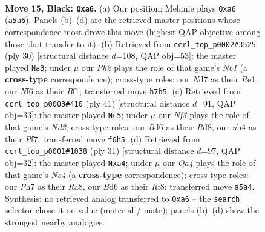 \documentclass[11pt]{article}
\begin{document}
\clearpage

\begin{figure}[p]\centering
\begin{subfigure}{0.46\textwidth}\centering
\resizebox{\linewidth}{!}{%
\newchessgame
\chessboard[
  setfen={r6r/p2nkppp/B1pbpn2/q7/Np1P1PPN/4P3/PP5P/R1BQ1RK1 b - - 0 15},
  showmover=false,
  pgfstyle=straightmove, color=movearrow, markmove={a5-a6}
]}
\caption{}
\end{subfigure}\hfill
\begin{subfigure}{0.46\textwidth}\centering
\resizebox{\linewidth}{!}{%
\newchessgame
\chessboard[
  setfen={r1bq1rk1/7p/pn2pppQ/1p1p3n/3P4/2P2N2/PP3PPP/RN2RBK1 w - - 0 16},
  showmover=false,
  pgfstyle=straightmove, color=movearrow, markmove={b1-a3}
]}
\caption{}
\end{subfigure}
\\[4pt]
\begin{subfigure}{0.46\textwidth}\centering
\resizebox{\linewidth}{!}{%
\newchessgame
\chessboard[
  setfen={r2r2k1/1p1n1pbp/2p2np1/p3pP2/P2qP3/2N2QP1/1PP3BP/R1B1K2R b KQ - 8 21},
  showmover=false,
  pgfstyle=straightmove, color=movearrow, markmove={d7-c5}
]}
\caption{}
\end{subfigure}\hfill
\begin{subfigure}{0.46\textwidth}\centering
\resizebox{\linewidth}{!}{%
\newchessgame
\chessboard[
  setfen={r4rk1/pp1nppbp/3p2p1/q1nP4/N3P3/4B1PP/PPN2PB1/1R1Q1RK1 b - - 0 16},
  showmover=false,
  pgfstyle=straightmove, color=movearrow, markmove={c5-a4}
]}
\caption{}
\end{subfigure}
\caption{\textbf{Move 15, Black: \texttt{Qxa6}.} (a) Our position; Melanie plays \texttt{Qxa6} (\texttt{a5a6}). Panels (b)--(d) are the retrieved master positions whose correspondence most drove this move (highest QAP objective among those that transfer to it). (b) Retrieved from \texttt{ccrl\_top\_p0002\#3525} (ply 30) [structural distance $d$=108, QAP obj=53]: the master played \texttt{Na3}; under $\mu$ our \emph{Ph2} plays the role of that game's \emph{Nb1} (a \textbf{cross-type} correspondence); cross-type roles: our \emph{N}d7 as their \emph{R}e1, our \emph{N}f6 as their \emph{B}f1; transferred move \texttt{h7h5}. (c) Retrieved from \texttt{ccrl\_top\_p0003\#410} (ply 41) [structural distance $d$=91, QAP obj=33]: the master played \texttt{Nc5}; under $\mu$ our \emph{Nf3} plays the role of that game's \emph{Nd2}; cross-type roles: our \emph{B}d6 as their \emph{R}d8, our \emph{n}h4 as their \emph{P}f7; transferred move \texttt{f6h5}. (d) Retrieved from \texttt{ccrl\_top\_p0001\#1038} (ply 31) [structural distance $d$=97, QAP obj=32]: the master played \texttt{Nxa4}; under $\mu$ our \emph{Qa4} plays the role of that game's \emph{Nc4} (a \textbf{cross-type} correspondence); cross-type roles: our \emph{P}h7 as their \emph{R}a8, our \emph{B}d6 as their \emph{R}f8; transferred move \texttt{a5a4}. Synthesis: no retrieved analog transferred to \texttt{Qxa6} -- the \texttt{search} selector chose it on value (material / mate); panels (b)--(d) show the strongest nearby analogies.}
\label{fig:thought-m29}
\end{figure}
\end{document}
